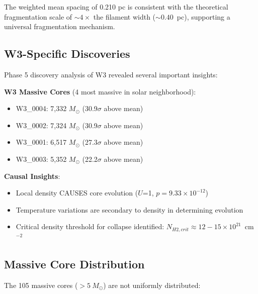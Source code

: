 \documentclass[11pt,a4paper]{article}
\begin{document}
The weighted mean spacing of 0.210 pc is consistent with the theoretical fragmentation scale of $\sim 4\times$ the filament width ($\sim 0.40$~pc), supporting a universal fragmentation mechanism.

\subsection{W3-Specific Discoveries}

Phase 5 discovery analysis of W3 revealed several important insights:

\textbf{W3 Massive Cores} (4 most massive in solar neighborhood):
\begin{itemize}
    \item W3\_0004: 7,332 $M_\odot$ (30.9$\sigma$ above mean)
    \item W3\_0002: 7,324 $M_\odot$ (30.9$\sigma$ above mean)
    \item W3\_0001: 6,517 $M_\odot$ (27.3$\sigma$ above mean)
    \item W3\_0003: 5,352 $M_\odot$ (22.2$\sigma$ above mean)
\end{itemize}

\textbf{Causal Insights}:
\begin{itemize}
    \item Local density CAUSES core evolution ($U$=1, $p=9.33\times10^{-12}$)
    \item Temperature variations are secondary to density in determining evolution
    \item Critical density threshold for collapse identified: $N_{H2,crit} \approx 12-15 \times 10^{21}$~cm$^{-2}$
\end{itemize}

\subsection{Massive Core Distribution}

The 105 massive cores ($>5~M_\odot$) are not uniformly distributed:
\end{document}
